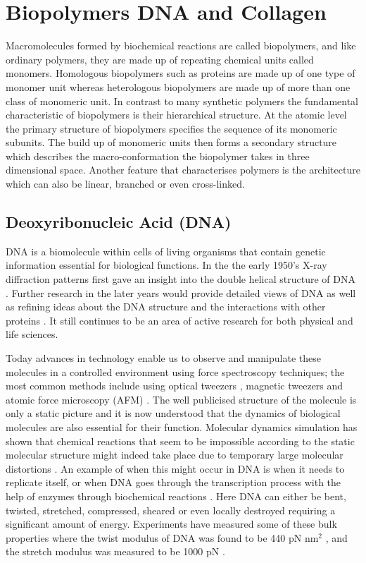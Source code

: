 \chapter{Biopolymers DNA and Collagen}

Macromolecules formed by biochemical reactions are called biopolymers, and like ordinary polymers, they are made up of repeating chemical units called monomers. Homologous biopolymers such as proteins are made up of one type of monomer unit whereas heterologous biopolymers are made up of more than one class of monomeric unit. In contrast to many synthetic polymers the fundamental characteristic of biopolymers is their hierarchical structure. At the atomic level the primary structure of biopolymers specifies the sequence of its monomeric subunits. The build up of monomeric units then forms a secondary structure which describes the macro-conformation the biopolymer takes in three dimensional space. Another feature that characterises polymers is the architecture which can also be linear, branched or even cross-linked.

\section{Deoxyribonucleic Acid (DNA)}

DNA is a biomolecule within cells of living organisms that contain genetic information essential for biological functions. In the the early 1950's X-ray diffraction patterns first gave an insight into the double helical structure of DNA \cite{Watson1953,Kittel1968}. Further research in the later years would provide detailed views of DNA as well as refining ideas about the DNA structure and the interactions with other proteins \cite{Klug2004}. It still continues to be an area of active research for both physical and life sciences.

Today advances in technology enable us to observe and manipulate these molecules in a controlled environment using force spectroscopy techniques; the most common methods include using optical tweezers \cite{Wang1997,VanMameren2009}, magnetic tweezers and atomic force microscopy (AFM) \cite{Marko2003,Lavery2002,Strick2003}. The well publicised structure of the molecule is only a static picture and it is now understood that the dynamics of biological molecules are also essential for their function. Molecular dynamics simulation has shown that chemical reactions that seem to be impossible according to the static molecular structure might indeed take place due to temporary large molecular distortions \cite{Karplus1990,Harris2005}. An example of when this might occur in DNA is when it needs to replicate itself, or when DNA goes through the transcription process with the help of enzymes through biochemical reactions \cite{Marko2003,Dauxois1993}. Here DNA can either be bent, twisted, stretched, compressed, sheared or even locally destroyed requiring a significant amount of energy. Experiments  have measured some of these bulk properties where the twist modulus of DNA was found to be 440 pN $\text{nm}^{2}$ \cite{Bryant2003}, and the stretch modulus was measured to be 1000 pN \cite{Lavery2002,Bustamante2000}.

